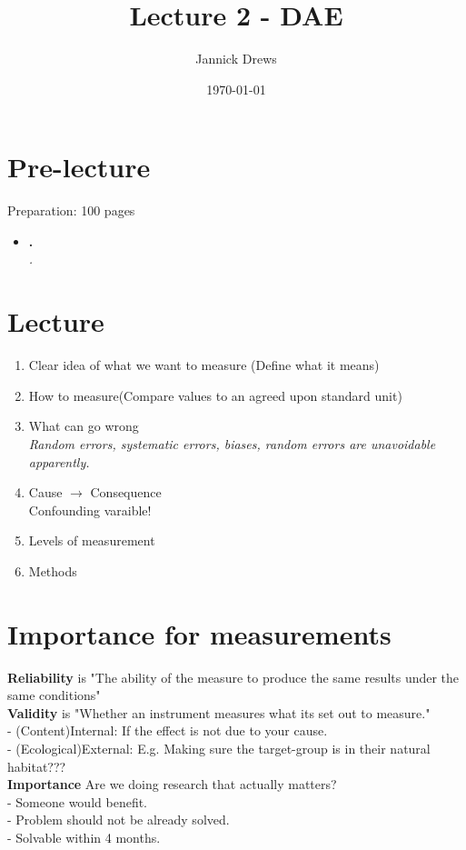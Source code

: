 \documentclass{article}
\title{Lecture 2 - DAE}
\author{Jannick Drews}
\date{\today}
\begin{document}
\maketitle
\newpage

\section{Pre-lecture}
Preparation: 100 pages\\
\begin{itemize}
  \item \textbf{.}\\
    \textit{.}
\end{itemize}

\section{Lecture}
\begin{enumerate}
    \item Clear idea of what we want to measure (Define what it means)
    \item How to measure(Compare values to an agreed upon standard unit)
    \item What can go wrong\\
        \textit{Random errors, systematic errors, biases, random errors are unavoidable apparently.}
    \item Cause $\rightarrow$ Consequence\\Confounding varaible!
    \item Levels of measurement
    \item Methods
\end{enumerate}

\section{Importance for measurements}
\textbf{Reliability} is "The ability of the measure to produce the same results under the same conditions"\\
\textbf{Validity} is "Whether an instrument measures what its set out to measure."\\
- (Content)Internal: If the effect is not due to your cause.\\
- (Ecological)External: E.g. Making sure the target-group is in their natural habitat???\\
\textbf{Importance} Are we doing research that actually matters?\\
- Someone would benefit.\\
- Problem should not be already solved.\\
- Solvable within 4 months.\\
\end{document}
